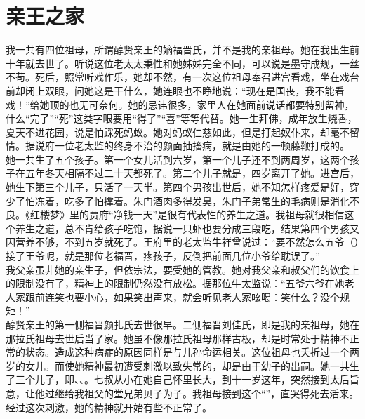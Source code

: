 \fancyhead[RO]{} %
\fancyhead[LE]{} %
\chapter*{亲王之家}
\thispagestyle{empty}
我一共有四位祖母，所谓醇贤亲王的嫡福晋氏，并不是我的亲祖母。她在我出生前十年就去世了。听说这位老太太秉性和她姊姊完全不同，可以说是墨守成规，一丝不苟。死后，照常听戏作乐，她却不然，有一次这位祖母奉召进宫看戏，坐在戏台前却闭上双眼，问她这是干什么，她连眼也不睁地说：“现在是国丧，我不能看戏！”给她顶的也无可奈何。她的忌讳很多，家里人在她面前说话都要特别留神，什么“完了”“死”这类字眼要用“得了”“喜”等等代替。她一生拜佛，成年放生烧香，夏天不进花园，说是怕踩死蚂蚁。她对蚂蚁仁慈如此，但是打起奴仆来，却毫不留情。据说府一位老太监的终身不治的颜面抽搐病，就是由她的一顿藤鞭打成的。\\

她一共生了五个孩子。第一个女儿活到六岁，第一个儿子还不到两周岁，这两个孩子在五年冬天相隔不过二十天都死了。第二个儿子就是，四岁离开了她。进宫后，她生下第三个儿子，只活了一天半。第四个男孩出世后，她不知怎样疼爱是好，穿少了怕冻着，吃多了怕撑着。朱门酒肉多得发臭，朱门子弟常生的毛病则是消化不良。《红楼梦》里的贾府“净钱一天”是很有代表性的养生之道。我祖母就很相信这个养生之道，总不肯给孩子吃饱，据说一只虾也要分成三段吃，结果第四个男孩又因营养不够，不到五岁就死了。王府里的老太监牛祥曾说过：“要不然怎么五爷（）接了王爷呢，就是那位老福晋，疼孩子，反倒把前面几位小爷给耽误了。”\\

我父亲虽非她的亲生子，但依宗法，要受她的管教。她对我父亲和叔父们的饮食上的限制没有了，精神上的限制仍然没有放松。据那位牛太监说：“五爷六爷在她老人家跟前连笑也要小心，如果笑出声来，就会听见老人家吆喝：笑什么？没个规矩！”\\

醇贤亲王的第一侧福晋颜扎氏去世很早。二侧福晋刘佳氏，即是我的亲祖母，她在那拉氏祖母去世后当了家。她虽不像那拉氏祖母那样古板，却是时常处于精神不正常的状态。造成这种病症的原因同样是与儿孙命运相关。这位祖母也夭折过一个两岁的女儿。而使她精神最初遭受刺激以致失常的，却是由于幼子的出嗣。她一共生了三个儿子，即、、。七叔从小在她自己怀里长大，到十一岁这年，突然接到太后旨意，让他过继给我祖父的堂兄弟贝子为子。我祖母接到这个“”，直哭得死去活来。经过这次刺激，她的精神就开始有些不正常了。\\

